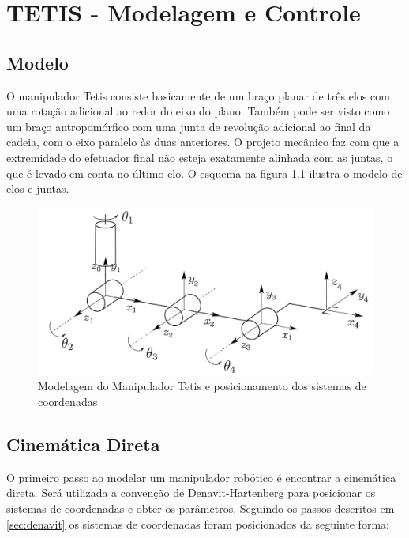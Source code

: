 \chapter{TETIS - Modelagem e Controle}


\section{Modelo}
O manipulador Tetis consiste basicamente de um braço planar de três elos com uma rotação adicional ao redor do eixo do plano. Também pode ser visto como um braço antropomórfico com uma junta de revolução adicional ao final da cadeia, com o eixo paralelo às duas anteriores. O projeto mecânico faz com que a extremidade do efetuador final não esteja exatamente alinhada com as juntas, o que é levado em conta no último elo. O esquema na figura \ref{fig:modelo_tetis} ilustra o modelo de elos e juntas. 
\begin{figure}[!ht]
\centering
  \includegraphics[width=0.9\linewidth]{./img/m2_meio_2.png}
  \caption{Modelagem do Manipulador Tetis e posicionamento dos sistemas de coordenadas}
  \label{fig:modelo_tetis}
\end{figure}%

\section{Cinemática Direta}
O primeiro passo ao modelar um manipulador robótico é encontrar a cinemática direta. Será utilizada a convenção de Denavit-Hartenberg para posicionar os sistemas de coordenadas e obter os parâmetros. Seguindo os passos descritos em \ref{sec:denavit} os sistemas de coordenadas foram posicionados da seguinte forma:

